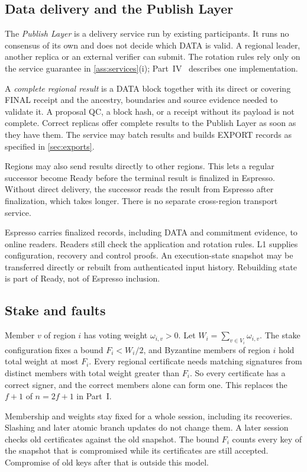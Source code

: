 \documentclass[11pt,a4paper]{article}
\newcommand{\defterm}[1]{\textcolor{rrBlue}{\textit{#1}}}
\begin{document}
\subsection{Data delivery and the Publish Layer}
\label{sec:delivery}
The \defterm{Publish Layer} is a delivery service run by existing
participants. It runs no consensus of its own and does not decide which
DATA is valid. A regional leader, another replica or an external
verifier can submit. The rotation rules rely only on the service
guarantee in \cref{ass:services}(i); Part~IV~\cite{part4}
describes one implementation.

A \defterm{complete regional result} is a DATA block together with its
direct or covering FINAL receipt and the ancestry, boundaries and source
evidence needed to validate it. A proposal QC, a block hash, or a receipt
without its payload is not complete. Correct replicas offer complete
results to the Publish Layer as soon as they have them. The service may
batch results and builds EXPORT records as specified in
\cref{sec:exports}.

Regions may also send results directly to other regions. This lets a
regular successor become Ready before the terminal result is finalized
in Espresso. Without direct delivery, the successor reads the result
from Espresso after finalization, which takes longer. There is no
separate cross-region transport service.

Espresso carries finalized records, including DATA and commitment
evidence, to online readers. Readers still check the application and
rotation rules. L1 supplies configuration, recovery and control proofs. An
execution-state snapshot may be transferred directly or rebuilt from
authenticated input history. Rebuilding state is part of Ready,
not of Espresso inclusion.

\subsection{Stake and faults}
\label{sec:stake}
Member $v$ of region $i$ has voting weight $\omega_{i,v}>0$. Let
$W_i=\sum_{v\in V_i}\omega_{i,v}$. The stake configuration fixes a bound
$F_i<W_i/2$, and Byzantine members of region $i$ hold total weight at
most $F_i$. Every regional certificate needs matching signatures from
distinct members with total weight greater than $F_i$. So every
certificate has a correct signer, and the correct members alone can form
one. This replaces the $f+1$ of $n=2f+1$ in Part~I.

Membership and weights stay fixed for a whole session, including its
recoveries. Slashing and later atomic branch updates do not change them. A later
session checks old certificates against the old snapshot. The bound
$F_i$ counts every key of the snapshot that is compromised while its
certificates are still accepted. Compromise of old keys after that is
outside this model.
\end{document}

